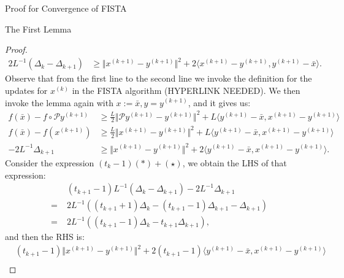 \documentclass[]{article}
\theoremstyle{definition}
\begin{document}
\begin{section}{Proof for Convergence of FISTA}
\begin{subsection}{The First Lemma}
\begin{proof}
\begin{align*}
                2L^{-1} (\Delta_k - \Delta_{k + 1}) 
                & \ge 
                \Vert x^{(k + 1)} - y^{(k + 1)}\Vert^2 + 
                2\langle x^{(k + 1)} - y^{(k + 1)}, y^{(k + 1)} - \bar x\rangle. 
                \tag{$*$}
            \end{align*}
            Observe that from the first line to the second line we invoke the definition for the updates for $x^{(k)}$ in the FISTA algorithm (HYPERLINK NEEDED). We then invoke the lemma again with $x:= \bar x, y = y^{(k + 1)}$, and it gives us: 
            \begin{align*}
                f(\bar x) - f\circ \mathcal P y^{(k + 1)}
                & \ge 
                \frac{L}{2}\Vert \mathcal P y^{(k + 1)} - y^{(k + 1)}\Vert^2 
                + L 
                \langle y^{(k + 1)} - \bar x, x^{(k + 1)} - y^{(k + 1)}\rangle
                \\
                f(\bar x) - f(x^{(k + 1)}) 
                &\ge 
                \frac{L}{2}\Vert x^{(k + 1)} - y^{(k + 1)}\Vert^2
                + 
                L \langle y^{(k + 1)} - \bar x, x^{(k + 1)} - y^{(k + 1)}\rangle
                \\
                -2L^{-1}\Delta_{k + 1}
                & \ge
                \Vert x^{(k + 1)} - y^{(k + 1)}\Vert^2
                + 
                2\langle y^{(k + 1)} - \bar x, x^{(k + 1)} - y^{(k + 1)}\rangle. 
                \tag{$\star$}
            \end{align*}
            Consider the expression $(t_k - 1)(*) + (\star)$, we obtain the LHS of that expression: 
            \begin{align*}
                &(t_{k + 1} - 1)L^{-1} (\Delta_k - \Delta_{k + 1}) 
                -
                2L^{-1}\Delta_{k + 1}
                \\
                = \; &
                2L^{-1}
                ((t_{k + 1} + 1)\Delta_k - (t_{k + 1} - 1)\Delta_{k + 1} - \Delta_{k + 1})
                \\
                = \; &
                2L^{-1}((t_{k + 1} - 1)\Delta_k - t_{k + 1}\Delta_{k + 1}),
                \tag{$\star *$LHS}
            \end{align*}
            and then the RHS is: 
            \begin{align*}
                & (t_{k + 1} - 1)\Vert x^{(k + 1)} - y^{(k + 1)}\Vert^2
                + 
                2(t_{k + 1} - 1)\langle y^{(k + 1)} - \bar x, x^{(k + 1)} - y^{(k + 1)}\rangle 
                \\

\end{align*}
\end{proof}
\end{subsection}
\end{section}
\end{document}
